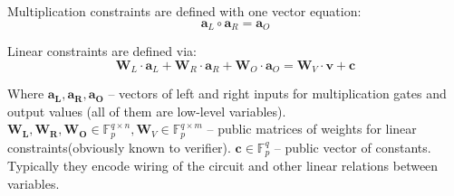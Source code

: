\documentclass[../lecture-notes-148x210.tex]{subfiles}
\begin{document}
Multiplication constraints are defined with one vector equation:
$$ \mathbf{a}_L \circ \mathbf{a}_R = \mathbf{a}_O $$

Linear constraints are defined via:
$$ \mathbf{W}_L \cdot \mathbf{a}_L + \mathbf{W}_R \cdot \mathbf{a}_R + \mathbf{W}_O \cdot \mathbf{a}_O = \mathbf{W}_V \cdot \mathbf{v} + \mathbf{c} $$

Where $\mathbf{a_L, a_R, a_O}$ -- vectors of left and right inputs for multiplication gates and output values (all of them are low-level variables). $\mathbf{W_L, W_R, W_O} \in \mathbb{F}_p^{q \times n}, \mathbf{W}_V \in \mathbb{F}_p^{q \times m}$ -- public matrices of weights for linear constraints(obviously known to verifier). $\mathbf{c} \in \mathbb{F}_p^q$ -- public vector of constants. Typically they encode wiring of the circuit and other linear relations between variables.
\end{document}

